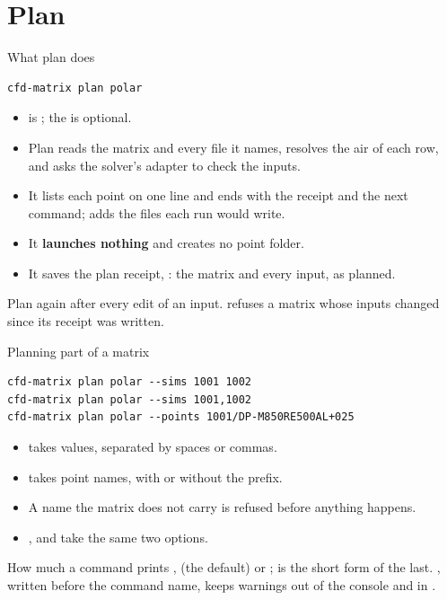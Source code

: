 %
%

\section{Plan}

\begin{frame}[fragile]{What plan does}
\begin{lstlisting}
cfd-matrix plan polar
\end{lstlisting}
\begin{itemize}
  \item {} is ; the  is
        optional.
  \item Plan reads the matrix and every file it names, resolves the air of
        each row, and asks the solver's adapter to check the inputs.
  \item It lists each point on one line and ends with the receipt and the
        next command;  adds the files each run would write.
  \item It \textbf{launches nothing} and creates no point folder.
  \item It saves the plan receipt, : the matrix
        and every input, as planned.
\end{itemize}
\begin{takeaway}Plan again after every edit of an input.  refuses a
matrix whose inputs changed since its receipt was written.\end{takeaway}
\end{frame}

\begin{frame}[fragile]{Planning part of a matrix}
\begin{lstlisting}
cfd-matrix plan polar --sims 1001 1002
cfd-matrix plan polar --sims 1001,1002
cfd-matrix plan polar --points 1001/DP-M850RE500AL+025
\end{lstlisting}
\begin{itemize}
  \item {} takes  values, separated by spaces or commas.
  \item {} takes point names, with or without the 
        prefix.
  \item A name the matrix does not carry is refused before anything
        happens.
  \item {},  and  take the same two
        options.
\end{itemize}
\begin{block}{How much a command prints}
,  (the default) or ;
 is the short form of the last. , written
before the command name, keeps warnings out of the console and in
.
\end{block}
\end{frame}

